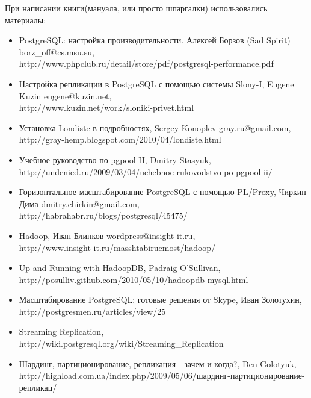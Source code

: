 \thispagestyle{empty}
При написании книги(мануала, или просто шпаргалки) использовались материалы:
\begin{itemize}
\item PostgreSQL: настройка производительности. Алексей Борзов (Sad Spirit) borz\_off@cs.msu.su, \\
http://www.phpclub.ru/detail/store/pdf/postgresql-performance.pdf
\item Настройка репликации в PostgreSQL с помощью системы Slony-I, Eugene Kuzin eugene@kuzin.net, \\
http://www.kuzin.net/work/sloniki-privet.html
\item Установка Londiste в подробностях, Sergey Konoplev gray.ru@gmail.com, \\
http://gray-hemp.blogspot.com/2010/04/londiste.html
\item Учебное руководство по pgpool-II, Dmitry Stasyuk, \\
http://undenied.ru/2009/03/04/uchebnoe-rukovodstvo-po-pgpool-ii/
\item Горизонтальное масштабирование PostgreSQL с помощью PL/Proxy, Чиркин Дима dmitry.chirkin@gmail.com, \\
http://habrahabr.ru/blogs/postgresql/45475/
\item Hadoop, Иван Блинков wordpress@insight-it.ru, \\
http://www.insight-it.ru/masshtabiruemost/hadoop/
\item Up and Running with HadoopDB, Padraig O'Sullivan, \\
http://posulliv.github.com/2010/05/10/hadoopdb-mysql.html
\item Масштабирование PostgreSQL: готовые решения от Skype, Иван Золотухин, \\
http://postgresmen.ru/articles/view/25
\item Streaming Replication, \\
http://wiki.postgresql.org/wiki/Streaming\_Replication
\item Шардинг, партиционирование, репликация - зачем и когда?, Den Golotyuk, \\
http://highload.com.ua/index.php/2009/05/06/шардинг-партиционирование-репликац/
\end{itemize}


\clearpage